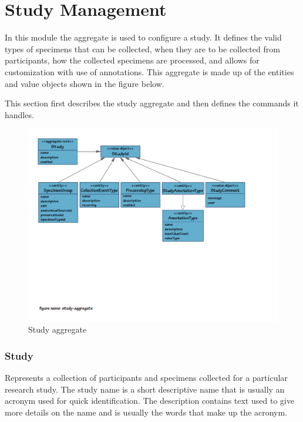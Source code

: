 \chapter{Study Management}

In this module the  aggregate is used to configure a
study. It defines the valid types of specimens that can be collected, when they
are to be collected from participants, how the collected specimens are
processed, and allows for customization with use of annotations. This aggregate
is made up of the entities and value objects shown in the figure below.

This section first describes the study aggregate and then defines the commands
it handles.

\begin{figure}[h]
  \includegraphics[trim={9mm 85mm 36mm 9mm}, clip,
    width=1\textwidth]{images/study-aggregate}
  \caption{Study aggregate}
  \label{fig:study-aggregate}
\end{figure}

\subsection*{Study}

Represents a collection of participants and specimens collected for a
particular research study. The study name is a short descriptive name that is
usually an acronym used for quick identification. The description contains text
used to give more details on the name and is usually the words that make up the
acronym.

